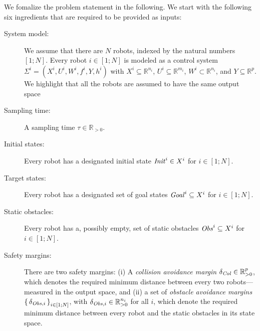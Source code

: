 We fomalize the problem statement in the following.
We start with the following six ingredients that are required to be provided as inputs:
\begin{description}
	\item[System model:] We assume that there are $N$ robots, indexed by the natural numbers $[1;N]$.
	Every robot $i\in [1;N]$ is modeled as a control system $\Sigma^i = (X^i, U^i, W^i, f^i, Y, h^i)$ with $X^i\subseteq \mathbb{R}^{n_i}$, $U^i\subseteq \mathbb{R}^{m_i}$, $W^i\subset \mathbb{R}^{n_i}$, and $Y\subseteq \mathbb{R}^p$.
	We highlight that all the robots are assumed to have the same output space
	\item[Sampling time:] A sampling time $\tau\in \mathbb{R}_{>0}$.
	\item[Initial states:] Every robot has a designated initial state $\mathit{Init}^i\in X^i$ for $i\in [1;N]$.
	\item[Target states:] Every robot has a designated set of goal states $\mathit{Goal}^i\subseteq X^i$  for $i\in [1;N]$.
	\item[Static obstacles:] Every robot has a, possibly empty, set of static obstacles $\mathit{Obs}^i\subseteq X^i$  for $i\in [1;N]$.
	\item[Safety margins:] There are two safety margins: (i) A \emph{collision avoidance margin} $\delta_{\mathit{Col}}\in \mathbb{R}^{p}_{>0}$, which denotes the required minimum distance between every two robots---measured in the output space, and (ii) a set of \emph{obstacle avoidance margins} $\set{\delta_{\mathit{Obs},i}}_{i\in [1;N]}$, with $\delta_{\mathit{Obs},i}\in \mathbb{R}^{n_i}_{>0}$ for all $i$, which denote the required minimum distance between every robot and the static obstacles in its state space.
\end{description}

